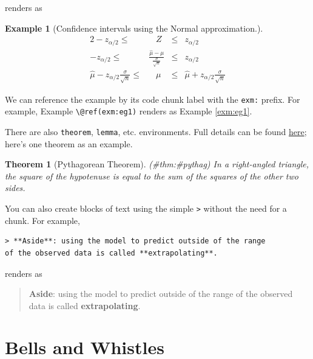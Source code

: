 \documentclass[
  british,
  oneside]{krantz}
\newtheorem{theorem}{Theorem}[chapter]
\theoremstyle{definition}
\theoremstyle{definition}
\newtheorem{example}{Example}[chapter]
\theoremstyle{definition}
\theoremstyle{definition}
\theoremstyle{remark}
\begin{document}
renders as

\begin{example}[Confidence intervals using the Normal approximation.]
\protect\hypertarget{exm:eg1}{}{\label{exm:eg1} {} }\begin{alignat*}{2}
-z_{\alpha/2} \leq{} & \;\;\;Z & \leq{} & z_{\alpha/2} \\
-z_{\alpha/2} \leq{} & \frac{\hat{\mu}-\mu}{\frac{\sigma}{\sqrt{n}}} & \leq{} & z_{\alpha/2}\\
\hat{\mu} - z_{\alpha/2}\frac{\sigma}{\sqrt{n}} \leq{} & \;\;\;\mu & \leq{} & \hat{\mu} + z_{\alpha/2}\frac{\sigma}{\sqrt{n}}
\end{alignat*}
\end{example}

We can reference the example by its code chunk label with the \texttt{exm:} prefix. For example, Example \texttt{\textbackslash{}@ref(exm:eg1)} renders as Example \ref{exm:eg1}.

There are also \texttt{theorem}, \texttt{lemma}, etc. environments. Full details can be found \href{https://bookdown.org/yihui/bookdown/markdown-extensions-by-bookdown.html}{here}; here's one theorem as an example.

\begin{theorem}[Pythagorean Theorem]
\protect\hypertarget{thm:ux5cux23pythag}{}{(\#thm:\#pythag) {} }In a right-angled triangle, the square of the hypotenuse is equal to the sum of the squares of
the other two sides.
\end{theorem}

You can also create blocks of text using the simple \texttt{\textgreater{}} without the need for a chunk. For example,

\begin{verbatim}
> **Aside**: using the model to predict outside of the range 
of the observed data is called **extrapolating**.
\end{verbatim}

renders as

\begin{quote}
\textbf{Aside}: using the model to predict outside of the range of the observed data is called \textbf{extrapolating}.
\end{quote}

\hypertarget{bellsandwhistles}{%
\chapter{Bells and Whistles}\label{bellsandwhistles}}
\end{document}
